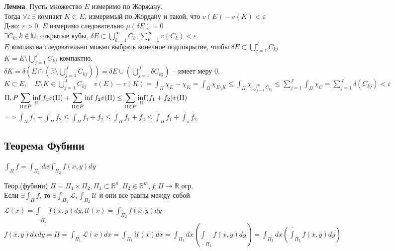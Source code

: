 \documentclass[12pt, a4paper]{article}
\theoremstyle{plain}
\begin{document}

    \textbf{Лемма}. Пусть множество $E$ измеримо по Жоржану. \\
    Тогда $\forall \varepsilon \, \exists \text{ компакт } K \subset E$, измеримый по Жордану
    и такой, что $v(E) - v(K) < \varepsilon$\\
    Д-во: $\varepsilon > 0$. $E$ измеримо следовательно $\mu(\delta E) = 0$\\
    $\exists C_k, k \in \mathbb{N}$, открытые кубы, $\delta E \subset \bigcup_{k=1}^\infty C_k, \sum_{k=1}^\infty v(C_k) < \varepsilon$.\\
    $E$ компактна следовательно можно выбрать конечное подпокрытие, чтобы $\delta E \subset 
    \bigcup_{j=1}^J C_{kj}$\\
    $K = \overline{E} \setminus \bigcup_{j=1}^J C_{kj}$ компактно.\\
    $\delta K = \delta (\overline{E} \cap (\mathbb{R} \setminus \bigcup^J_{j=1} C_{kj})) = \delta E \cup (\bigcup^J_{j=1} \delta C_{kj})$ -- имеет меру 0.\\
    $K \subset E, \quad E \setminus K \in \bigcup^J_{j=1} C_{kj} \quad v(E) - v(K) = \int_\Pi \chi_E - \chi_K =
    \int_\Pi \chi_{E \setminus K} \le \int_\Pi \chi_{\bigcup^\infty_{j=1} C_{kj}} \le
    \sum^J_{j=1} \int_\Pi \chi_C = \sum^J_{j=1} \delta(C_{kj}) < \varepsilon
    $ %
    \\

    $
    \displaystyle
    \Pi, P \\ \sum_{\Pi \in P} \inf_\Pi f_1 v(\Pi) + \sum_{\Pi \in P} \inf f_2 v(\Pi) \le
    \sum_{\Pi \in P} \inf_\Pi (f_1 + f_2) v(\Pi)
    $\\

    $
    \displaystyle
    \implies \int_\Pi f_1 + \int_\Pi f_2 \le \int_\Pi f_1 + f_2 \le \overline\int_\Pi f_1 + f_2
    \le \overline\int_\Pi f_1 + \overline\int_\pi f_2
    $

    \subsection*{Теорема Фубини}
    $\int_\Pi f = \int_{\Pi_1} dx \int_{\Pi_2} f(x,y) dy$

    Теор.(фубини)
    $\Pi = \Pi_1 \times \Pi_2, \Pi_1 \subset \mathbb{R}^n, \Pi_2 \in \mathbb{R}^m, f: \Pi \to \mathbb{R}$ огр.\\
    Если $\exists \int_\Pi f$, то $\exists \int_{\Pi_1}\mathscr{L}, \int_{\Pi_2} \mathscr{U}$ и они все равны между собой
    \\
    $\mathscr{L}(x) = \underline\int_{\Pi_2} f(x,y)dy, \mathscr{U}(x) = \overline\int_{\Pi_2}f(x,y) dy$\\
    $f(x,y) dxdy = \Pi = \int_{\Pi_1}\mathscr{L}(x)dx = \int_{\Pi_1}\mathscr{U}(x)dx = \int_{\Pi_1}dx(\underline\int_{\Pi_2}f(x,y)dy) = \int_{\Pi_1}dx(\overline\int_{\Pi_2}f(x,y)dy)$\\
\end{document}

